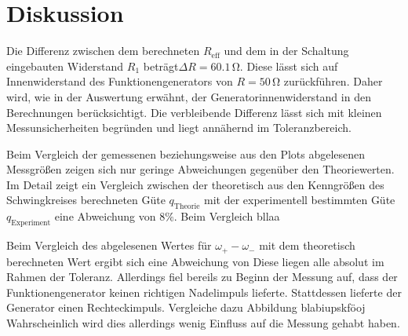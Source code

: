 \section{Diskussion}
\label{sec:Diskussion}
Die Differenz zwischen dem berechneten $R_\text{eff}$ und dem in der Schaltung eingebauten Widerstand $R_\text{1}$ beträgt$\Delta R=60.1 \,\si{\ohm}$.
Diese lässt sich auf Innenwiderstand des Funktionengenerators von $R=50\,\si{\ohm}$ zurückführen.
Daher wird, wie in der Auswertung erwähnt, der Generatorinnenwiderstand in den Berechnungen berücksichtigt.
Die verbleibende Differenz lässt sich mit kleinen Messunsicherheiten begründen und liegt annähernd im Toleranzbereich.

Beim Vergleich der gemessenen beziehungsweise aus den Plots abgelesenen Messgrößen zeigen sich nur geringe Abweichungen gegenüber den Theoriewerten.
Im Detail zeigt ein Vergleich zwischen der theoretisch aus den Kenngrößen des Schwingkreises berechneten Güte $q_\mathrm{Theorie}$ mit der experimentell bestimmten Güte $q_\mathrm{Experiment}$ eine Abweichung von $8\%$.
Beim Vergleich bllaa

Beim Vergleich des abgelesenen Wertes für $\omega_+ - \omega_-$ mit dem theoretisch berechneten Wert ergibt sich eine Abweichung von
Diese liegen alle absolut im Rahmen der Toleranz.
Allerdings fiel bereils zu Beginn der Messung auf, dass der Funktionengenerator keinen richtigen Nadelimpuls lieferte. Stattdessen lieferte der Generator einen Rechteckimpuls. Vergleiche dazu Abbildung blabiupskföoj
Wahrscheinlich wird dies allerdings wenig Einfluss auf die Messung gehabt haben.
